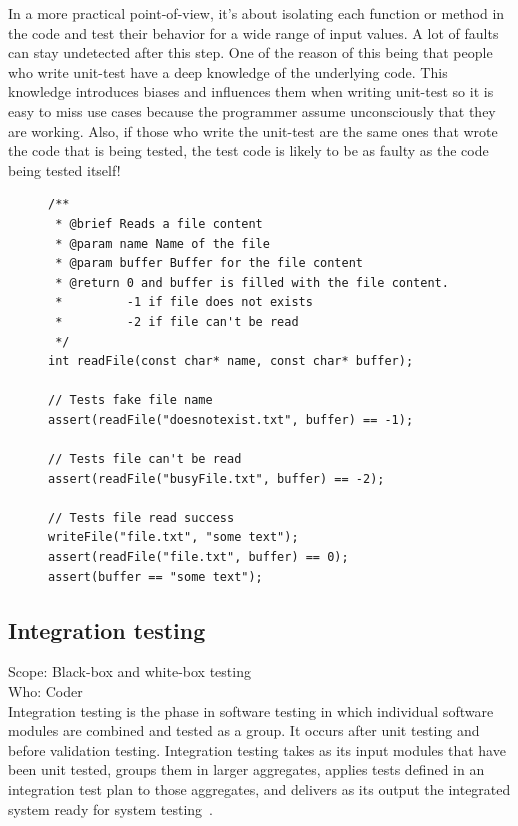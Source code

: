 \documentclass[12pt]{article}
\theoremstyle{definition}
\theoremstyle{definition}
\theoremstyle{remark}
\begin{document}
In a more practical point-of-view, it's about isolating each function or method in the code and test their behavior for a wide range of input values. A lot of faults can stay undetected after this step. One of the reason of this being that people who write unit-test have a deep knowledge of the underlying code. This knowledge introduces biases and influences them when writing unit-test so it is easy to miss use cases because the programmer assume unconsciously that they are working. Also, if those who write the unit-test are the same ones that wrote the code that is being tested, the test code is likely to be as faulty as the code being tested itself!

\begin{figure}
\label{unit_testing_sample}
\begin{lstlisting}[caption=Brief example of what unit testing is (C pseudocode),label={lst:unit_testing_sample}]
/**
 * @brief Reads a file content
 * @param name Name of the file
 * @param buffer Buffer for the file content
 * @return 0 and buffer is filled with the file content.
 *         -1 if file does not exists
 *         -2 if file can't be read
 */
int readFile(const char* name, const char* buffer);

// Tests fake file name
assert(readFile("doesnotexist.txt", buffer) == -1);

// Tests file can't be read
assert(readFile("busyFile.txt", buffer) == -2);

// Tests file read success
writeFile("file.txt", "some text");
assert(readFile("file.txt", buffer) == 0);
assert(buffer == "some text");
\end{lstlisting}
\end{figure}


\subsection{Integration testing}

Scope: Black-box and white-box testing\\
Who: Coder\\

Integration testing is the phase in software testing in which individual software modules are combined and tested as a group. It occurs after unit testing and before validation testing. Integration testing takes as its input modules that have been unit tested, groups them in larger aggregates, applies tests defined in an integration test plan to those aggregates, and delivers as its output the integrated system ready for system testing~\cite{TestingInSoftwareDevelopment:1987}.\\
\end{document}
